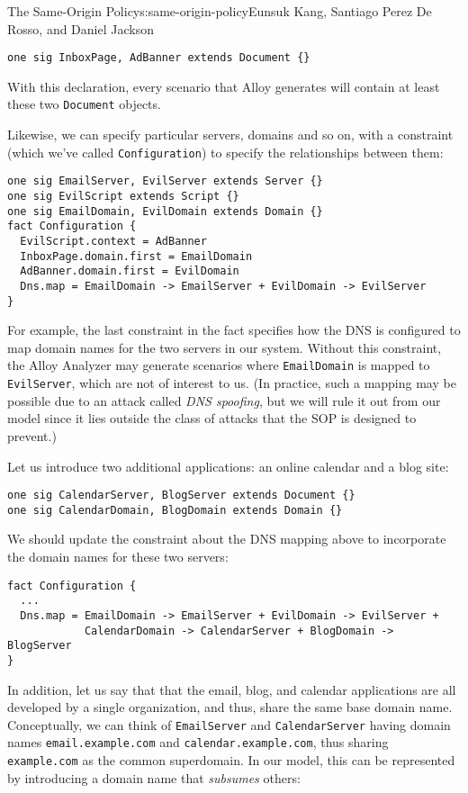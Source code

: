 \begin{aosachapter}{The Same-Origin Policy}{s:same-origin-policy}{Eunsuk Kang, Santiago Perez De Rosso, and Daniel Jackson}
\begin{verbatim}
one sig InboxPage, AdBanner extends Document {}
\end{verbatim}

With this declaration, every scenario that Alloy generates will contain
at least these two \texttt{Document} objects.

Likewise, we can specify particular servers, domains and so on, with a
constraint (which we've called \texttt{Configuration}) to specify the
relationships between them:

\begin{verbatim}
one sig EmailServer, EvilServer extends Server {}
one sig EvilScript extends Script {}
one sig EmailDomain, EvilDomain extends Domain {}
fact Configuration {
  EvilScript.context = AdBanner
  InboxPage.domain.first = EmailDomain
  AdBanner.domain.first = EvilDomain  
  Dns.map = EmailDomain -> EmailServer + EvilDomain -> EvilServer
}
\end{verbatim}

For example, the last constraint in the fact specifies how the DNS is
configured to map domain names for the two servers in our system.
Without this constraint, the Alloy Analyzer may generate scenarios where
\texttt{EmailDomain} is mapped to \texttt{EvilServer}, which are not of
interest to us. (In practice, such a mapping may be possible due to an
attack called \emph{DNS spoofing}, but we will rule it out from our
model since it lies outside the class of attacks that the SOP is
designed to prevent.)

Let us introduce two additional applications: an online calendar and a
blog site:

\begin{verbatim}
one sig CalendarServer, BlogServer extends Document {} 
one sig CalendarDomain, BlogDomain extends Domain {}
\end{verbatim}

We should update the constraint about the DNS mapping above to
incorporate the domain names for these two servers:

\begin{verbatim}
fact Configuration {
  ...
  Dns.map = EmailDomain -> EmailServer + EvilDomain -> EvilServer + 
            CalendarDomain -> CalendarServer + BlogDomain -> BlogServer  
}
\end{verbatim}

In addition, let us say that that the email, blog, and calendar
applications are all developed by a single organization, and thus, share
the same base domain name. Conceptually, we can think of
\texttt{EmailServer} and \texttt{CalendarServer} having domain names
\texttt{email.example.com} and \texttt{calendar.example.com}, thus
sharing \texttt{example.com} as the common superdomain. In our model,
this can be represented by introducing a domain name that
\emph{subsumes} others:


\end{aosachapter}
